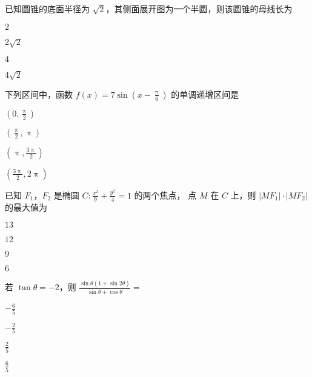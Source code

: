 \documentclass[zihao = -4]{exam-zh}
\begin{document}
\begin{question}
  已知圆锥的底面半径为 $\sqrt{2}$，其侧面展开图为一个半圆，则该圆锥的母线长为 \paren
  \begin{choices}
    \item $2$
    \item $2 \sqrt{2}$
    \item $4$
    \item $4 \sqrt{2}$
  \end{choices}
\end{question}

\begin{question}
  下列区间中，函数 $f(x) = 7 \sin \left( x - \frac{\uppi}{6} \right)$ 的单调递增区间是 \paren
  \begin{choices}
    \item $\left( 0               , \frac{\uppi}{2}  \right)$
    \item $\left( \frac{\uppi}{2} , \uppi            \right)$
    \item $\left( \uppi           , \frac{3\uppi}{2} \right)$
    \item $\left( \frac{3\uppi}{2}, 2\uppi           \right)$
  \end{choices}
\end{question}

\begin{question}
  已知 $F_1$，$F_2$ 是椭圆 $C \colon \frac{x^2}{9} + \frac{y^2}{4} = 1$ 的两个焦点，
  点 $M$ 在 $C$ 上，则 $|M F_1| \cdot |M F_2|$ 的最大值为 \paren
  \begin{choices}
    \item $13$
    \item $12$
    \item $9$
    \item $6$
  \end{choices}
\end{question}

\begin{question}
  若 $\tan\theta = -2$，则 $\frac{\sin\theta (1 + \sin 2\theta)}{\sin\theta + \cos\theta} = $ \paren
  \begin{choices}
    \item $-\frac{6}{5}$
    \item $-\frac{2}{5}$
    \item $\frac{2}{5}$
    \item $\frac{6}{5}$
  \end{choices}
\end{question}
\end{document}
